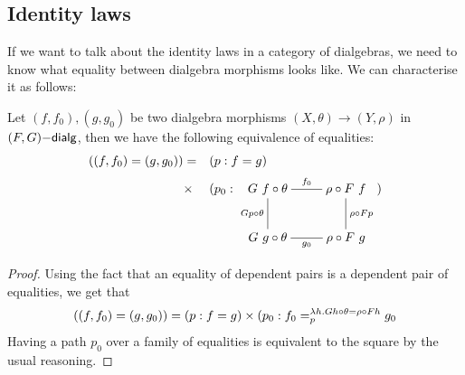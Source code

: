 \subsection{Identity laws}

If we want to talk about the identity laws in a category of
dialgebras, we need to know what equality between dialgebra morphisms
looks like. We can characterise it as follows:

\begin{proposition}
  \label{morphism-equality}
  Let $(f,f_0),(g,g_0)$ be two dialgebra morphisms
  $(X,\theta) \to (Y,\rho)$ in $\dialgcat{F}{G}$, then we have the
  following equivalence of equalities:
  \begin{align*}
    ((f,f_0) = (g,g_0)) &= &&(p : f = g)\\
    &\times &&(p_0 : 
              \xymatrix{
              G\ f \circ \theta
              \ar@{-}[r]^{f_0}
              \ar@{-}[d]_{G p \circ \theta}
              &\rho \circ F\ f
              \ar@{-}[d]^{\rho \circ F p}
              \\
              G\ g \circ \theta
              \ar@{-}[r]_{g_0}
              &\rho \circ F\ g
              })
  \end{align*}
\end{proposition}

\begin{proof}
  Using the fact that an equality of dependent pairs is a dependent pair of equalities, we get that
  $$
  ((f,f_0) = (g,g_0)) = (p : f = g) \times (p_0 : \pathover{\lambda h . G h \circ \theta = \rho \circ F h}{p}{f_0}{g_0}
  $$
  Having a path $p_0$ over a family of equalities is equivalent to the
  square by the usual reasoning.
\end{proof}

